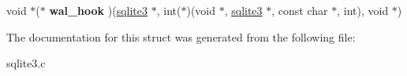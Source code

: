 \begin{DoxyCompactItemize}
\item 
\hypertarget{structsqlite3__api__routines_ad2420d28d695f23941f69e53777819a9}{void $\ast$($\ast$ {\bfseries wal\-\_\-hook} )(\hyperlink{structsqlite3}{sqlite3} $\ast$, int($\ast$)(void $\ast$, \hyperlink{structsqlite3}{sqlite3} $\ast$, const char $\ast$, int), void $\ast$)}\label{structsqlite3__api__routines_ad2420d28d695f23941f69e53777819a9}

\end{DoxyCompactItemize}


The documentation for this struct was generated from the following file\-:\begin{DoxyCompactItemize}
\item 
sqlite3.\-c\end{DoxyCompactItemize}
